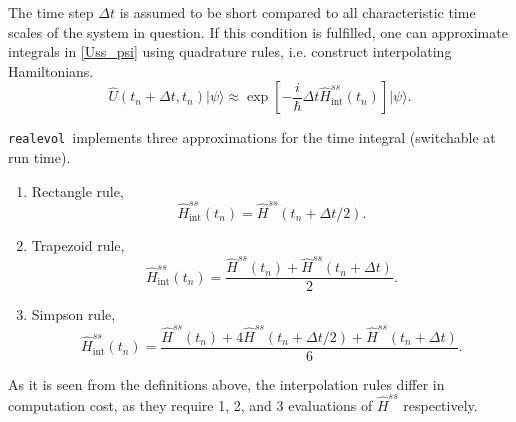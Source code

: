 \documentclass[]{article}
\newcommand{\realevol}{\texttt{realevol}}
\newcommand{\ket}[1]{\ensuremath{|#1\rangle}}
\begin{document}
The time step $\Delta t$ is assumed to be short compared to all characteristic time scales of the system in question. If this condition is fulfilled, one can approximate integrals in \ref{Uss_psi} using quadrature rules, i.e. construct interpolating Hamiltonians.
\begin{equation}\label{U_psi_dynamic}
    \hat U(t_n + \Delta t, t_n)\ket{\psi} \approx
    \exp\left[-\frac{i}{\hbar}\Delta t \hat H_\mathrm{int}^{ss}(t_n) \right]
    \ket{\psi}.
\end{equation}

\realevol\ implements three approximations for the time integral (switchable at run time).

\begin{enumerate}
    \item Rectangle rule,
    \begin{equation}\label{U_rectangle}
        \hat H_\mathrm{int}^{ss}(t_n) = \hat H^{ss}(t_n + \Delta t/2).
    \end{equation}
    \item Trapezoid rule,
    \begin{equation}\label{U_trapezoid}
        \hat H_\mathrm{int}^{ss}(t_n) =
        \frac{\hat H^{ss}(t_n) + \hat H^{ss}(t_n + \Delta t)}{2}.
    \end{equation}
    \item Simpson rule,
    \begin{equation}\label{U_simpson}
        \hat H_\mathrm{int}^{ss}(t_n) =
        \frac{\hat H^{ss}(t_n) + 4\hat H^{ss}(t_n + \Delta t/2) +
        \hat H^{ss}(t_n + \Delta t)}{6}.
    \end{equation}
\end{enumerate}
As it is seen from the definitions above, the interpolation rules differ in computation cost, as they require 1, 2, and 3 evaluations of $\hat H^{ss}$ respectively.
\end{document}
